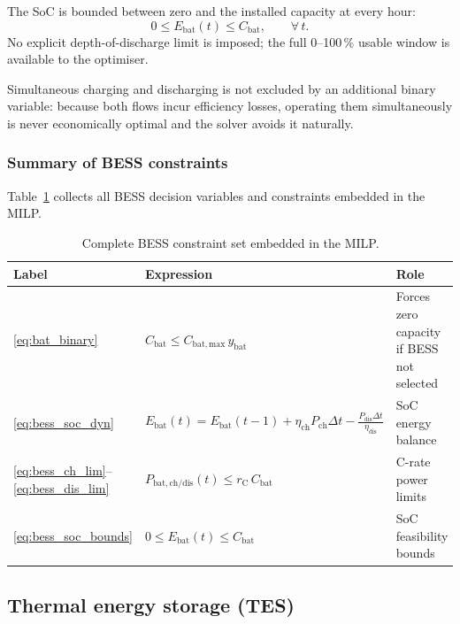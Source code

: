 \documentclass[11pt,a4paper]{report}
\begin{document}
The SoC is bounded between zero and the installed capacity at every hour:
\begin{equation}
    0 \leq E_\mathrm{bat}(t) \leq C_\mathrm{bat},
    \qquad \forall\,t.
    \label{eq:bess_soc_bounds}
\end{equation}
No explicit depth-of-discharge limit is imposed; the full 0--100\,\% usable
window is available to the optimiser.

Simultaneous charging and discharging is not excluded by an additional binary
variable: because both flows incur efficiency losses, operating them
simultaneously is never economically optimal and the solver avoids it
naturally.

\subsubsection{Summary of BESS constraints}

Table~\ref{tab:bess_summary} collects all BESS decision variables and
constraints embedded in the MILP.

\begin{table}[H]
\centering
\caption{Complete BESS constraint set embedded in the MILP.}
\label{tab:bess_summary}
\begin{tabular}{llp{5.5cm}}
\hline
\textbf{Label} & \textbf{Expression} & \textbf{Role} \\
\hline
\eqref{eq:bat_binary}
    & $C_\mathrm{bat} \leq C_\mathrm{bat,max}\,y_\mathrm{bat}$
    & Forces zero capacity if BESS not selected \\
\eqref{eq:bess_soc_dyn}
    & $E_\mathrm{bat}(t) = E_\mathrm{bat}(t-1) + \eta_\mathrm{ch}P_\mathrm{ch}\Delta t - \frac{P_\mathrm{dis}\Delta t}{\eta_\mathrm{dis}}$
    & SoC energy balance \\
\eqref{eq:bess_ch_lim}--\eqref{eq:bess_dis_lim}
    & $P_\mathrm{bat,ch/dis}(t) \leq r_\mathrm{C}\,C_\mathrm{bat}$
    & C-rate power limits \\
\eqref{eq:bess_soc_bounds}
    & $0 \leq E_\mathrm{bat}(t) \leq C_\mathrm{bat}$
    & SoC feasibility bounds \\
\hline
\end{tabular}
\end{table}

\subsection{Thermal energy storage (TES)}
\label{sec:tes_model}
\end{document}
